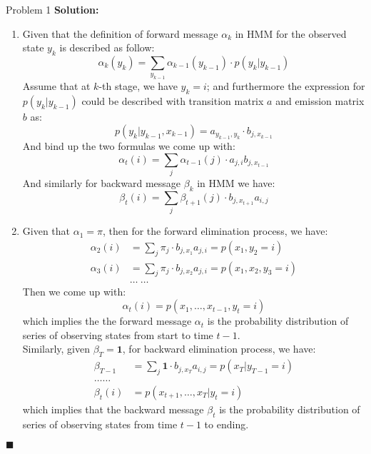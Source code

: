 \documentclass{article}
\newenvironment{solution}                               %
{\textbf{Solution:} }{$\blacksquare$}                   %
\newcommand{\vecOne}{\textbf{1}}                        %
\begin{document}
\begin{section}{Problem 1}
        \begin{solution}
            \begin{enumerate}[label=\alph*)]
                \item %
                Given that the definition of forward message $\alpha_k$ in HMM for the observed state $y_k$ is described as follow:
                $$
                \alpha_k(y_k) = \sum_{y_{k-1}} \alpha_{k-1}(y_{k-1}) \cdot p(y_k|y_{k-1})
                $$
                Assume that at $k$-th stage, we have $y_k=i$; and furthermore the expression for $p(y_k | y_{k-1})$ could be described with transition matrix $a$ and emission matrix $b$ as:
                $$
                p(y_k | y_{k-1}, x_{k-1}) = a_{y_{k-1}, y_k} \cdot b_{j, x_{k-1}}
                $$
                And bind up the two formulas we come up with:
                $$
                \alpha_t(i) = \sum_j \alpha_{t-1}(j) \cdot a_{j,i}b_{j,x_{t-1}}
                $$
                And similarly for backward message $\beta_k$ in HMM we have:
                $$
                \beta_t(i) = \sum_j \beta_{t+1}(j) \cdot b_{j,x_{t+1}}a_{i,j}
                $$

                \item %
                Given that $\alpha_1=\pi$, then for the forward elimination process, we have:
                \begin{align*}
                    \alpha_2(i) &= \sum_j \pi_j \cdot b_{j,x_1}a_{j,i} = p(x_1,y_2=i)
                    \\
                    \alpha_3(i) &= \sum_j \pi_j \cdot b_{j,x_2}a_{j,i} = p(x_1,x_2,y_3=i)
                    \\
                    & \dots\ \dots
                \end{align*}
                Then we come up with:
                $$
                \alpha_t(i) = p(x_1, \dots, x_{t-1}, y_t=i)
                $$
                which implies the the forward message $\alpha_t$ is the probability distribution of series of observing states from start to time $t-1$. \\
                Similarly, given $\beta_T=\vecOne$, for backward elimination process, we have:
                \begin{align*}
                    \beta_{T-1} &= \sum_j \vecOne \cdot b_{j,x_T}a_{i,j} = p(x_T|y_{T-1}=i)
                    \\
                    \dots \dots
                    \\
                    \beta_t(i) &= p(x_{t+1}, \dots, x_T | y_t=i)
                \end{align*}
                which implies that the backward message $\beta_t$ is the probability distribution of series of observing states from time $t-1$ to ending.
                

\end{enumerate}
\end{solution}
\end{section}
\end{document}
